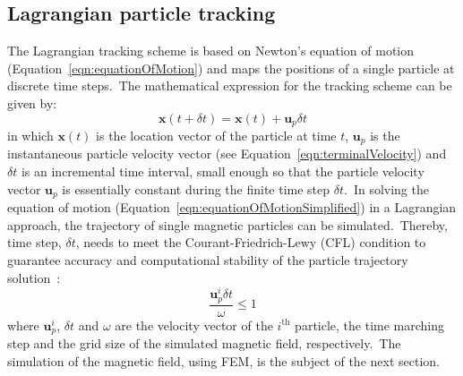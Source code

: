 \subsection{Lagrangian particle tracking}\label{subsec:lagrangianParticleTracking}
The Lagrangian tracking scheme is based on Newton's equation of motion (Equation~\ref{eqn:equationOfMotion}) and maps the positions of a single particle at discrete time steps.\ The mathematical expression for the tracking scheme can be given by:\
\begin{equation}
	\mathbf{x}(t+\delta t) = \mathbf{x}(t)+\mathbf{u}_{p}\delta t
	\label{eqn:lagrangianEquation}
\end{equation}
in which $\mathbf{x}(t)$ is the location vector of the particle at time $t$, $\mathbf{u}_{p}$ is the instantaneous particle velocity vector (see Equation~\ref{eqn:terminalVelocity}) and $\delta t$ is an incremental time interval, small enough so that the particle velocity vector $\mathbf{u}_{p}$ is essentially constant during the finite time step $\delta t$.\ In solving the equation of motion (Equation~\ref{eqn:equationOfMotionSimplified}) in a Lagrangian approach, the trajectory of single magnetic particles can be simulated.\ Thereby, time step, $\delta t$, needs to meet the Courant-Friedrich-Lewy (CFL) condition to guarantee accuracy and computational stability of the particle trajectory solution~\cite{Courant1967}:\
\begin{equation}
	\frac{\mathbf{u}_{p}^{i}\delta t}{\omega} \leq 1
	\label{eqn:courantFriedrichsLewy} 
\end{equation}
where $\mathbf{u}_{p}^{i}$, $\delta t$ and $\omega$ are the velocity vector of the $i^{\text{th}}$ particle, the time marching step and the grid size of the simulated magnetic field, respectively.\ The simulation of the magnetic field, using FEM, is the subject of the next section.\
%
